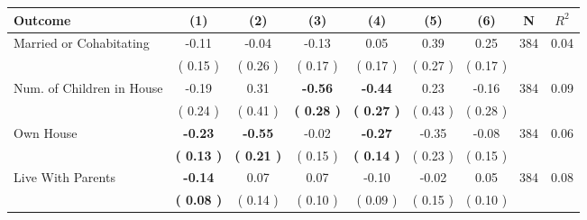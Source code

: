 \begin{tabular}{lcccccccc}
\toprule
 \textbf{Outcome} & \textbf{(1)} & \textbf{(2)} & \textbf{(3)} & \textbf{(4)} & \textbf{(5)} & \textbf{(6)} & \textbf{N} & \textbf{$ R^2$} \\
\midrule
Married or Cohabitating &     -0.11 &     -0.04 &     -0.13 &      0.05 &      0.39 &      0.25 & 384 &       0.04 \\ 
 & (     0.15 ) & (     0.26 ) & (     0.17 ) & (     0.17 ) & (     0.27 ) & (     0.17 ) & \\
Num. of Children in House &     -0.19 &      0.31 & \textbf{    -0.56} & \textbf{    -0.44} &      0.23 &     -0.16 & 384 &       0.09 \\ 
 & (     0.24 ) & (     0.41 ) & \textbf{(     0.28 )} & \textbf{(     0.27 )} & (     0.43 ) & (     0.28 ) & \\
Own House & \textbf{    -0.23} & \textbf{    -0.55} &     -0.02 & \textbf{    -0.27} &     -0.35 &     -0.08 & 384 &       0.06 \\ 
 & \textbf{(     0.13 )} & \textbf{(     0.21 )} & (     0.15 ) & \textbf{(     0.14 )} & (     0.23 ) & (     0.15 ) & \\
Live With Parents & \textbf{    -0.14} &      0.07 &      0.07 &     -0.10 &     -0.02 &      0.05 & 384 &       0.08 \\ 
 & \textbf{(     0.08 )} & (     0.14 ) & (     0.10 ) & (     0.09 ) & (     0.15 ) & (     0.10 ) & \\
\bottomrule
\end{tabular}
